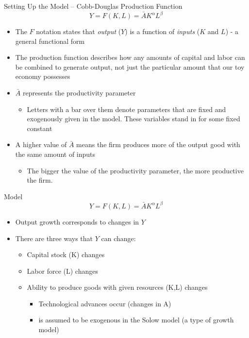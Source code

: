 \documentclass[aspectratio=1610]{beamer}
\begin{document}
\begin{frame}[wide]{Setting Up the Model – Cobb-Douglas  Production Function}
	\[Y=F(K,L) = \bar{A} K^{\alpha}L^{\beta}\]
	\begin{itemize}
		\item The $F$ notation states that \textit{output} ($Y$) is a function of \textit{inputs} ($K$ and $L$) - a general functional form
		\item The production function describes how any amounts of capital and labor can be combined to generate output, not just the particular amount that our toy economy possesses
		\item $\bar{A}$ represents the productivity parameter
		\begin{itemize}
			\item Letters with a bar over them denote parameters that are fixed and exogenously given in the model. These variables stand in for some fixed constant
		\end{itemize}
		\item A higher value of $\bar{A}$ means the firm produces more of the output good with the same amount of inputs
		\begin{itemize}
			\item The bigger the value of the productivity parameter, the more productive the firm.
		\end{itemize}

	\end{itemize}
\end{frame}

\begin{frame}[wide]{Model}
	\[Y=F(K,L) = \bar{A} K^{\alpha}L^{\beta}\]
	\begin{itemize}
		\item Output growth corresponds to changes in $Y$
		\item There are three ways that $Y$ can change:
		\begin{itemize}
			\item Capital stock (K) changes
			\item Labor force (L) changes
			\item Ability to produce goods with given resources (K,L) changes
			\begin{itemize}
				\item Technological advances occur (changes in A)
				\item is assumed to be exogenous in the Solow model (a type of growth model)
			\end{itemize}
		\end{itemize}
	\end{itemize}
\end{frame}
\end{document}
